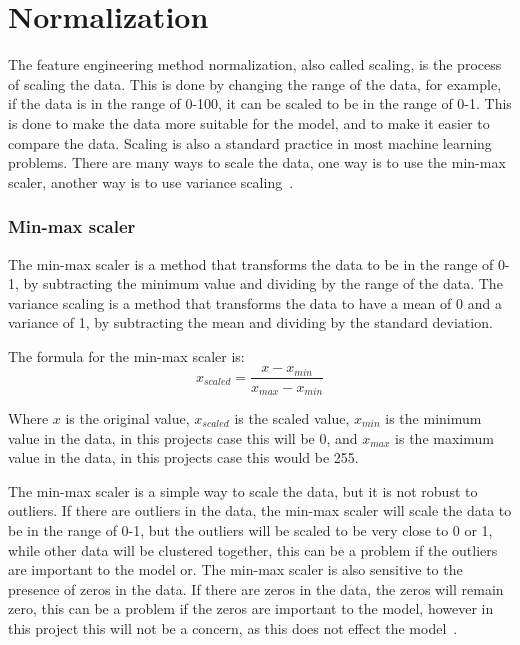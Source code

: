 \section{Normalization}\label{sec:normalization}
The feature engineering method normalization, also called scaling, is the process of scaling the data. This is done by changing the range of the data, for example, if the data is in the range of 0-100, it can be scaled to be in the range of 0-1. This is done to make the data more suitable for the model, and to make it easier to compare the data. Scaling is also a standard practice in most machine learning problems. There are many ways to scale the data, one way is to use the min-max scaler, another way is to use variance scaling~\cite{Feature-engineering-zheng}. 
\subsubsection{Min-max scaler}
The min-max scaler is a method that transforms the data to be in the range of 0-1, by subtracting the minimum value and dividing by the range of the data. The variance scaling is a method that transforms the data to have a mean of 0 and a variance of 1, by subtracting the mean and dividing by the standard deviation.

The formula for the min-max scaler is:
\begin{equation}
    x_{scaled} = \frac{x - x_{min}}{x_{max} - x_{min}}
\end{equation}

Where $x$ is the original value, $x_{scaled}$ is the scaled value, $x_{min}$ is the minimum value in the data, in this projects case this will be 0, and $x_{max}$ is the maximum value in the data, in this projects case this would be 255. 

The min-max scaler is a simple way to scale the data, but it is not robust to outliers. If there are outliers in the data, the min-max scaler will scale the data to be in the range of 0-1, but the outliers will be scaled to be very close to 0 or 1, while other data will be clustered together, this can be a problem if the outliers are important to the model or. The min-max scaler is also sensitive to the presence of zeros in the data. If there are zeros in the data, the zeros will remain zero, this can be a problem if the zeros are important to the model, however in this project this will not be a concern, as this does not effect the model~\cite{Feature-engineering-zheng}. 
